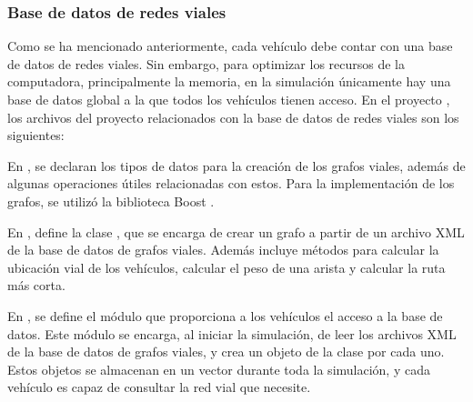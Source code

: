 
\subsubsection{Base de datos de redes viales}

\label{subsubsec:base_de_datos_de_redes_viales}

Como se ha mencionado anteriormente, cada vehículo debe contar con una base de
datos de redes viales. Sin embargo, para optimizar los recursos de la
computadora, principalmente la memoria, en la simulación únicamente hay una
base de datos global a la que todos los vehículos tienen acceso. En el proyecto
, los archivos del proyecto relacionados con la base de datos
de redes viales son los siguientes:


En , se declaran los tipos de datos para la creación
de los grafos viales, además de algunas operaciones útiles relacionadas con
estos. Para la implementación de los grafos, se utilizó la biblioteca Boost
\cite{Boost}.

En , define la clase , que se encarga de
crear un grafo a partir de un archivo XML de la base de datos de grafos viales.
Además incluye métodos para calcular la ubicación vial de los vehículos,
calcular el peso de una arista y calcular la ruta más corta.

En , se define el módulo que proporciona a los
vehículos el acceso a la base de datos. Este módulo se encarga, al iniciar la
simulación, de leer los archivos XML de la base de datos de grafos viales, y
crea un objeto de la clase  por cada uno. Estos objetos se
almacenan en un vector durante toda la simulación, y cada vehículo es capaz de
consultar la red vial que necesite.



